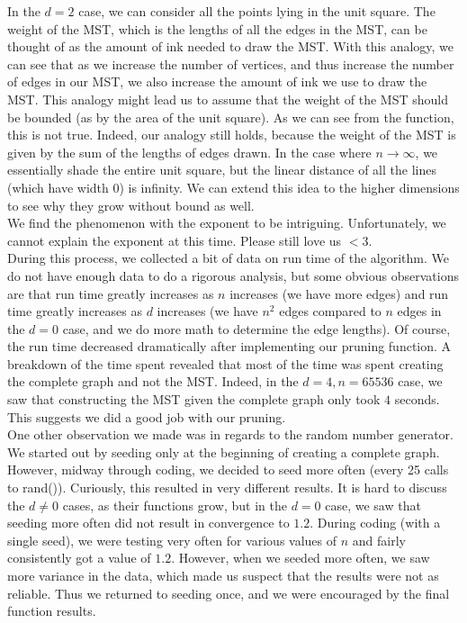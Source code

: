 \documentclass[12pt]{article}
\begin{document}
In the $d = 2$ case, we can consider all the points lying in the unit square. The weight of the MST, which is the lengths of all the edges in the MST, can be thought of as the amount of ink needed to draw the MST. With this analogy, we can see that as we increase the number of vertices, and thus increase the number of edges in our MST, we also increase the amount of ink we use to draw the MST. This analogy might lead us to assume that the weight of the MST should be bounded (as by the area of the unit square). As we can see from the function, this is not true. Indeed, our analogy still holds, because the weight of the MST is given by the sum of the lengths of edges drawn. In the case where $n \to \infty$, we essentially shade the entire unit square, but the linear distance of all the lines (which have width 0) is infinity. We can extend this idea to the higher dimensions to see why they grow without bound as well. \\

We find the phenomenon with the exponent to be intriguing. Unfortunately, we cannot explain the exponent at this time. Please still love us $<$3. \\

During this process, we collected a bit of data on run time of the algorithm. We do not have enough data to do a rigorous analysis, but some obvious observations are that run time greatly increases as $n$ increases (we have more edges) and run time greatly increases as $d$ increases (we have $n^2$ edges compared to $n$ edges in the $d=0$ case, and we do more math to determine the edge lengths). Of course, the run time decreased dramatically after implementing our pruning function. A breakdown of the time spent revealed that most of the time was spent creating the complete graph and not the MST. Indeed, in the $d=4, n = 65536$ case, we saw that constructing the MST given the complete graph only took $4$ seconds. This suggests we did a good job with our pruning. \\

One other observation we made was in regards to the random number generator. We started out by seeding only at the beginning of creating a complete graph. However, midway through coding, we decided to seed more often (every 25 calls to rand()). Curiously, this resulted in very different results. It is hard to discuss the $d \ne 0$ cases, as their functions grow, but in the $d = 0$ case, we saw that seeding more often did not result in convergence to $1.2$. During coding (with a single seed), we were testing very often for various values of $n$ and fairly consistently got a value of $1.2$. However, when we seeded more often, we saw more variance in the data, which made us suspect that the results were not as reliable. Thus we returned to seeding once, and we were encouraged by the final function results. 
\end{document}
